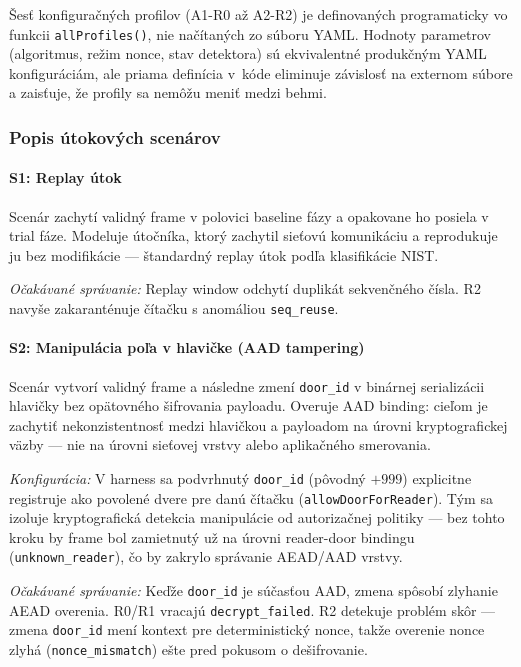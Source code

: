 \noindent Šesť konfiguračných profilov (A1-R0 až A2-R2) je definovaných programaticky vo funkcii \texttt{allProfiles()}, nie načítaných zo súboru YAML. Hodnoty parametrov (algoritmus, režim nonce, stav detektora) sú ekvivalentné produkčným YAML konfiguráciám, ale priama definícia v~kóde eliminuje závislosť na externom súbore a zaisťuje, že profily sa nemôžu meniť medzi behmi.

\subsubsection{Popis útokových scenárov}
\label{sec:scenarios}

\paragraph{S1: Replay útok}

Scenár zachytí validný frame v polovici baseline fázy a opakovane ho posiela v trial fáze. Modeluje útočníka, ktorý zachytil sieťovú komunikáciu a reprodukuje ju bez modifikácie --- štandardný replay útok podľa klasifikácie NIST\cite{NIST80098}.

\textit{Očakávané správanie:} Replay window odchytí duplikát sekvenčného čísla. R2 navyše zakaranténuje čítačku s anomáliou \texttt{seq\_reuse}.

\paragraph{S2: Manipulácia poľa v hlavičke (AAD tampering)}

Scenár vytvorí validný frame a následne zmení \texttt{door\_id} v binárnej serializácii hlavičky bez opätovného šifrovania payloadu. Overuje AAD binding: cieľom je zachytiť nekonzistentnosť medzi hlavičkou a payloadom na úrovni kryptografickej väzby --- nie na úrovni sieťovej vrstvy alebo aplikačného smerovania.

\textit{Konfigurácia:} V harness sa podvrhnutý \texttt{door\_id} (pôvodný $+ 999$) explicitne registruje ako povolené dvere pre danú čítačku (\texttt{allowDoorForReader}). Tým sa izoluje kryptografická detekcia manipulácie od autorizačnej politiky --- bez tohto kroku by frame bol zamietnutý už na úrovni reader-door bindingu (\texttt{unknown\_reader}), čo by zakrylo správanie AEAD/AAD vrstvy.

\textit{Očakávané správanie:} Keďže \texttt{door\_id} je súčasťou AAD, zmena spôsobí zlyhanie AEAD overenia. R0/R1 vracajú \texttt{decrypt\_failed}. R2 detekuje problém skôr --- zmena \texttt{door\_id} mení kontext pre deterministický nonce, takže overenie nonce zlyhá (\texttt{nonce\_mismatch}) ešte pred pokusom o dešifrovanie.

